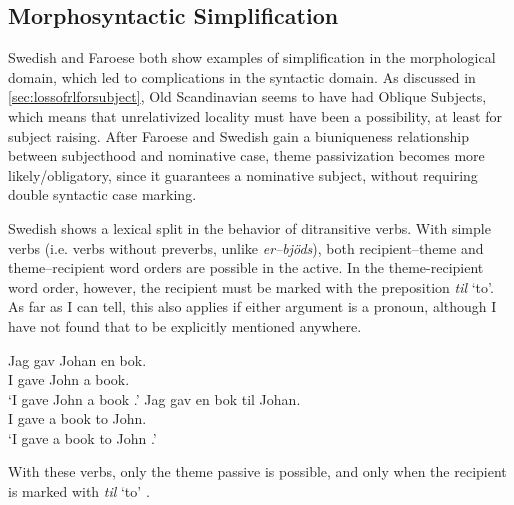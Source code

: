\subsection{Morphosyntactic Simplification}\label{sec:morphsimp}
Swedish and Faroese both show examples of simplification in the morphological domain, which led to complications in the syntactic domain. As discussed in \autoref{sec:lossofrlforsubject}, Old Scandinavian seems to have had Oblique Subjects, which means that unrelativized locality must have been a possibility, at least for subject raising. After Faroese and Swedish gain a biuniqueness relationship between subjecthood and nominative case, theme passivization becomes more likely/obligatory, since it guarantees a nominative subject, without requiring double syntactic case marking.

Swedish shows a lexical split in the behavior of ditransitive verbs. With simple verbs (i.e. verbs without preverbs, unlike \emph{er--bjöds}), both recipient--theme and theme--recipient word orders are possible in the active. In the theme-recipient word order, however, the recipient must be marked with the preposition \emph{til} `to'. As far as I can tell, this also applies if either argument is a pronoun, although I have not found that to be explicitly mentioned anywhere.
\begin{exe}
\ex 
\begin{xlist}
\ex \gll Jag gav Johan en bok.\\
I gave John a book.\\
\trans `I gave John a book \citep{Holmberg.1995}.'
\ex \gll Jag gav en bok til Johan.\\
I gave a book to John.\\
\trans `I gave a book to John \citep{Holmberg.1995}.'
\end{xlist}
\end{exe}

With these verbs, only the theme passive is possible, and only when the recipient is marked with \emph{til} `to' \citep{Anward.1989,Lundquist.2006}.

